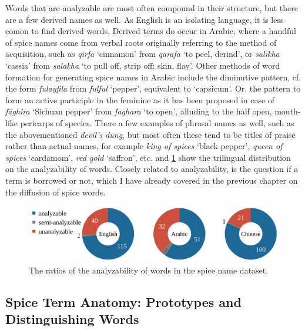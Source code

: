Words that are analyzable are most often compound in their structure, but there are a few derived names as well. As English is an isolating language, it is less comon to find derived words. Derived terms do occur in Arabic, where a handful of spice names come from verbal roots originally referring to the method of acquisition, such as \textit{qirfa} `cinnamon' from \textit{qarafa} `to peel, derind', or \textit{salīkha} `cassia' from \textit{salakha} `to pull off, strip off; skin, flay'. Other methods of word formation for generating spice names in Arabic include the diminutive pattern, cf. the form \textit{fulayfila} from \textit{fulful} `pepper', equivalent to `capsicum'. Or, the pattern to form an active participle in the feminine as it has been proposed in case of \textit{fāghira} `Sichuan pepper' from \textit{faghara} `to open', alluding to the half open, mouth-like pericarps of  species. There a few examples of phrasal names as well, such as the abovementioned \textit{devil's dung}, but most often these tend to be titles of praise rather than  actual names, for example \textit{king of spices} `black pepper', \textit{queen of spices} `cardamom', \textit{red gold} `saffron', etc.  and \cref{fig:analyzability_tripie} show the trilingual distribution on the analyzability of words. Closely related to analyzability, is the question if a term is borrowed or not, which I have already covered in the previous chapter on the diffusion of spice words.

  \begin{figure}[ht!]
    \includegraphics[width=\linewidth]{imgs/plots/analyzability_tripie.pdf}
    \caption{The ratios of the analyzability of words in the spice name dataset.}
    \label{fig:analyzability_tripie}
  \end{figure}



\subsection{Spice Term Anatomy: Prototypes and Distinguishing Words}

